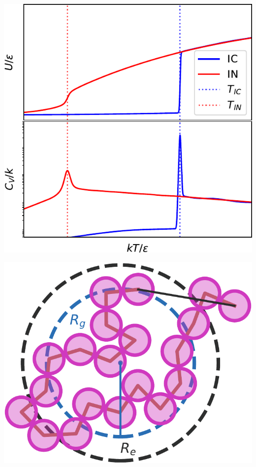 \documentclass[aspectratio=169]{beamer}
\begin{document}
\begin{frame}[c]{}

  \centering
    \includegraphics[height=\textheight]{../figures/ch2_method/fig-UandCv/fig-UandCv.pdf}

\end{frame}

\begin{frame}[c]{}

  \centering
    \includegraphics[height=\textheight]{../figures/ch2_method/fig-polymer_sizes/fig-polymer_sizes.pdf}

\end{frame}
\end{document}
